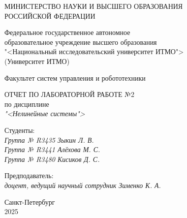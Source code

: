 \thispagestyle{empty}

\begin{center}
    МИНИСТЕРСТВО НАУКИ И ВЫСШЕГО ОБРАЗОВАНИЯ \\ РОССИЙСКОЙ ФЕДЕРАЦИИ

    \vspace{20pt}

    Федеральное государственное автономное \\ образовательное учреждение высшего образования \\
    "<Национальный исследовательский университет ИТМО"> \\
    (Университет ИТМО)

    \vspace{20pt}

    Факультет систем управления и робототехники
\end{center}

\vfill

\begin{center}
    ОТЧЕТ ПО ЛАБОРАТОРНОЙ РАБОТЕ №2\\  
    по дисциплине \\
    \textit{"<Нелинейные системы">}

    \vspace{20pt}

\end{center}

\vfill

    \noindent Студенты: \\
    \textit{Группа № R3435 \hfill Зыкин Л. В.} \\
    \textit{Группа № R3441 \hfill Алёхова М. С.} \\
    \textit{Группа № R3480 \hfill Кисиков Д. С.} \\

    \vspace{20pt}

    \noindent Предподаватель: \\
    \textit{доцент, ведущий научный сотрудник \hfill Зименко К. А.}

\vfill

\begin{center}
    Санкт-Петербург \\ 2025
\end{center}
